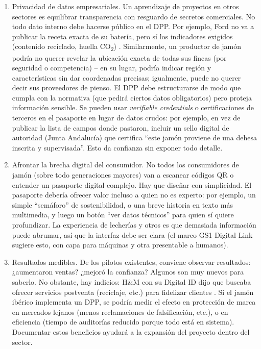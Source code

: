 \begin{enumerate}
    \item Privacidad de datos empresariales. Un aprendizaje de proyectos en otros sectores es equilibrar transparencia con resguardo de secretos comerciales. No todo dato interno debe hacerse público en el DPP. Por ejemplo, Ford no va a publicar la receta exacta de su batería, pero sí los indicadores exigidos (contenido reciclado, huella CO\textsubscript{2}) \cite{noauthor_10_nodate-1}. Similarmente, un productor de jamón podría no querer revelar la ubicación exacta de todas sus fincas (por seguridad o competencia) – en su lugar, podría indicar región y características sin dar coordenadas precisas; igualmente, puede no querer decir sus proveedores de pienso. El DPP debe estructurarse de modo que cumpla con la normativa (que pedirá ciertos datos obligatorios) pero proteja información sensible. Se pueden usar \textit{verifiable credentials} o certificaciones de terceros en el pasaporte en lugar de datos crudos: por ejemplo, en vez de publicar la lista de campos donde pastaron, incluir un sello digital de autoridad (Junta Andalucía) que certifica “este jamón proviene de una dehesa inscrita y supervisada”. Esto da confianza sin exponer todo detalle.
    \item Afrontar la brecha digital del consumidor. No todos los consumidores de jamón (sobre todo generaciones mayores) van a escanear códigos QR o entender un pasaporte digital complejo. Hay que diseñar con simplicidad. El pasaporte debería ofrecer valor incluso a quien no es experto: por ejemplo, un simple “semáforo” de sostenibilidad, o una breve historia en texto más multimedia, y luego un botón “ver datos técnicos” para quien sí quiere profundizar. La experiencia de lecherías y otros es que demasiada información puede abrumar, así que la interfaz debe ser clara (el marco GS1 Digital Link sugiere esto, con capa para máquinas y otra presentable a humanos).
    \item Resultados medibles. De los pilotos existentes, conviene observar resultados: ¿aumentaron ventas? ¿mejoró la confianza? Algunos son muy nuevos para saberlo. No obstante, hay indicios: H\&M con su Digital ID dijo que buscaba ofrecer servicios postventa (reciclaje, etc.) para fidelizar clientes \cite{noauthor_10_nodate-1}. Si el jamón ibérico implementa un DPP, se podría medir el efecto en protección de marca en mercados lejanos (menos reclamaciones de falsificación, etc.), o en eficiencia (tiempo de auditorías reducido porque todo está en sistema). Documentar estos beneficios ayudará a la expansión del proyecto dentro del sector.
\end{enumerate}

